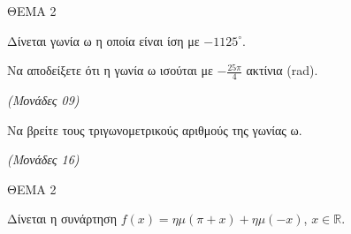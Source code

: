 \documentclass[11pt,a4paper,twoside]{book}
\newcommand{\monades}[1]{\hfill \textit{(Μονάδες #1)}}
\begin{document}
\vspace{4mm}

ΘΕΜΑ 2

Δίνεται γωνία ω η οποία είναι ίση με $-1125^{\circ}$.

\begin{alist}
\item Να αποδείξετε ότι η γωνία ω ισούται με $-\frac{25\pi}{4}$ ακτίνια (rad).

\monades{09}

\item Να βρείτε τους τριγωνομετρικούς αριθμούς της γωνίας ω.

\monades{16}
\end{alist}

\vspace{4mm}

ΘEMA 2

Δίνεται η συνάρτηση $f(x) = \eta\mu(\pi + x) + \eta\mu(-x)$, $x \in \mathbb{R}$.
\end{document}
